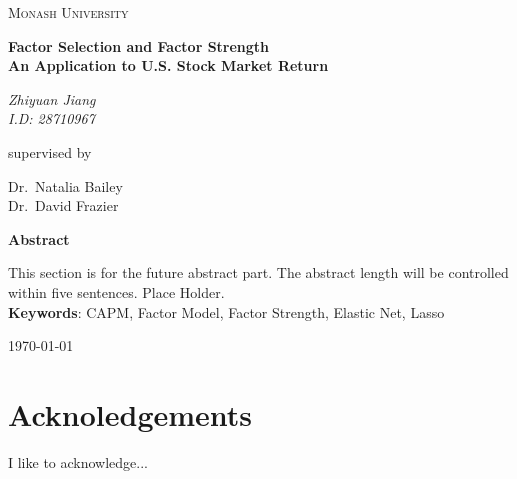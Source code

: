 
	\begin{titlepage}
		{\centering
			{\scshape\LARGE Monash University \par}
			\vspace{0.5cm}
			\vspace{0.5cm}
			{\huge\bfseries Factor Selection and Factor Strength\\
				\Large An Application to U.S. Stock Market Return\par}
			\vspace{2cm}
			{\Large\itshape Zhiyuan Jiang\\
				I.D: 28710967\par}
			\vfill
			\large supervised by\par
			Dr.~Natalia Bailey\\ Dr.~David Frazier
			
			\vspace{1cm}\textbf{Abstract}\par}
This section is for the future abstract part.
The abstract length will be controlled within five sentences.
Place Holder.\\
		\noindent \textbf{Keywords}: CAPM, Factor Model, Factor Strength, Elastic Net, Lasso
		
		\vfill
		{\centering\large \today\par}
	\end{titlepage}


\section*{Acknoledgements}
I like to acknowledge...




